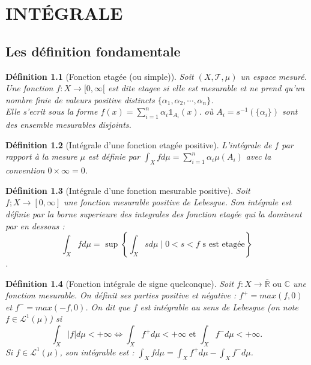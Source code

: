 \documentclass[a4paper,12pt,french]{report}
\theoremstyle{break}
\newtheorem{defin}{Définition}[section]
\begin{document}

\chapter{INTÉGRALE}
\section{Les définition fondamentale}
\begin{defin}[Fonction etagée (ou simple)]
       Soit $(X, \mathcal{T}, \mu)$ un espace mesuré. Une fonction $f : X \rightarrow [0, \infty[$ est dite etagee si elle est mesurable et ne prend qu'un nombre finie de valeurs positive distincts $\{ \alpha_{1}, \alpha_{2}, \cdots, \alpha_{n}\}$.\\ Elle s'ecrit sous la forme $ \displaystyle f(x) = \sum_{i=1}^{n} \alpha_{i} \mathds{1}_{A_{i}}(x).$ où $A_{i} = s^{-1}(\{ \alpha_{i}\})$ sont des ensemble mesurables disjoints.
\end{defin}

\begin{defin}[Intégrale d'une fonction etagée positive]
       L'intégrale de $f$ par rapport à la mesure $\mu$ est définie par $ \displaystyle \int_{X} f d\mu = \sum_{i=1}^{n} \alpha_{i} \mu(A_{i})$ avec la convention $0 \times \infty = 0$.
\end{defin}

\begin{defin}[Intégrale d'une fonction mesurable positive]
       Soit $f ; X \rightarrow [0, \infty]$ une fonction mesurable positive de Lebesgue. Son intégrale est définie par la borne superieure des integrales des fonction etagée qui la dominent par en dessous : $$\int_{X} f d\mu = \mbox{ sup } \left\{ \int_{X} s d\mu \; | \; 0 < s < f \mbox{ s est etagée} \right\}$$.
\end{defin}

\begin{defin}[Fonction intégrale de signe quelconque]
       Soit $f : X \rightarrow \overline{\mathbb{R}} \mbox{ ou } \mathbb{C}$ une fonction mesurable. On définit ses parties positive et négative : $f^{+} = max(f, 0)$ et $f^{-} = max(-f, 0)$. On dit que $f$ est intégrable au sens de Lebesgue (on note $f \in \mathcal{L}^{1}(\mu)$) si $$\int_{X} |f|d\mu < +\infty \Leftrightarrow \int_{X} f^{+} d\mu < +\infty \mbox{ et } \int_{X} f^{-}d\mu < +\infty.$$
       Si $f \in \mathcal{L}^{1}(\mu)$, son intégrable est : $ \displaystyle \int_{X} fd\mu = \int_{X} f^{+}d\mu - \int_{X} f^{-} d\mu$.
\end{defin}
\end{document}
